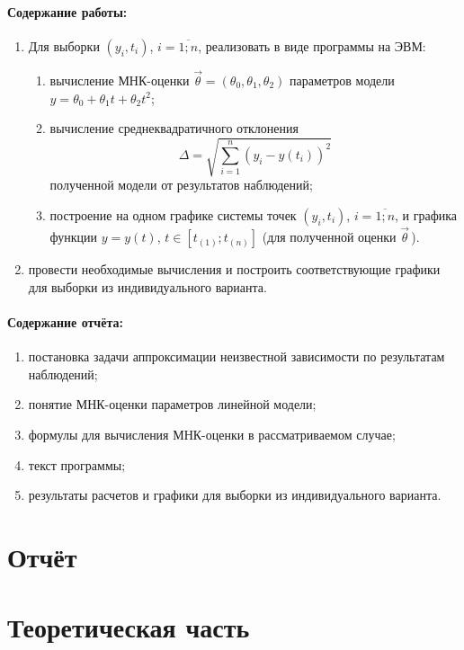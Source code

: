 \documentclass[a4paper, 12pt]{article}
\theoremstyle{definition}
\begin{document}
\paragraph{Содержание работы:}
\begin{enumerate}
	\item Для выборки $(y_i, t_i)$, $i = \overline{1; n}$, реализовать в виде программы на ЭВМ:
	\begin{enumerate}
		\item вычисление МНК-оценки $\vec\theta = (\theta_0, \theta_1, \theta_2)$ параметров модели $y = \theta_0 + \theta_1 t + \theta_2 t^2$;
		\item вычисление среднеквадратичного отклонения $$\Delta = \sqrt{\sum_{i=1}^{n}\left(y_i - y(t_i)\right)^2}$$ полученной модели от результатов наблюдений;
		\item построение на одном графике системы точек $(y_i, t_i)$, $i = \overline{1; n}$, и графика функции $y = y(t)$, $t \in \left[t_{(1)}; t_{(n)}\right]$ (для полученной оценки $\vec\theta$\,).
	\end{enumerate}
	\item провести необходимые вычисления и построить соответствующие графики для выборки из индивидуального варианта.
\end{enumerate}

\paragraph{Содержание отчёта:}
\begin{enumerate}
	\item постановка задачи аппроксимации неизвестной зависимости по результатам наблюдений;
	\item понятие МНК-оценки параметров линейной модели;
	\item формулы для вычисления МНК-оценки в рассматриваемом случае;
	\item текст программы;
	\item результаты расчетов и графики для выборки из индивидуального варианта.
\end{enumerate}

\pagebreak
\section{Отчёт}

\section{Теоретическая часть}
\end{document}
